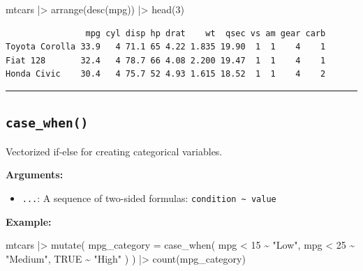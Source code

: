 \documentclass[
  letterpaper,
  DIV=11,
  numbers=noendperiod]{scrreprt}
\newenvironment{Shaded}{\begin{snugshade}}{\end{snugshade}}
\newcommand{\AttributeTok}[1]{\textcolor[rgb]{0.40,0.45,0.13}{#1}}
\newcommand{\ConstantTok}[1]{\textcolor[rgb]{0.56,0.35,0.01}{#1}}
\newcommand{\DecValTok}[1]{\textcolor[rgb]{0.68,0.00,0.00}{#1}}
\newcommand{\FunctionTok}[1]{\textcolor[rgb]{0.28,0.35,0.67}{#1}}
\newcommand{\NormalTok}[1]{\textcolor[rgb]{0.00,0.23,0.31}{#1}}
\newcommand{\SpecialCharTok}[1]{\textcolor[rgb]{0.37,0.37,0.37}{#1}}
\newcommand{\StringTok}[1]{\textcolor[rgb]{0.13,0.47,0.30}{#1}}
\providecommand{\tightlist}{%
  \setlength{\itemsep}{0pt}\setlength{\parskip}{0pt}}
\begin{document}
\begin{Shaded}
\begin{Highlighting}[]
\NormalTok{mtcars }\SpecialCharTok{|\textgreater{}}
  \FunctionTok{arrange}\NormalTok{(}\FunctionTok{desc}\NormalTok{(mpg)) }\SpecialCharTok{|\textgreater{}}
  \FunctionTok{head}\NormalTok{(}\DecValTok{3}\NormalTok{)}
\end{Highlighting}
\end{Shaded}

\begin{verbatim}
                mpg cyl disp hp drat    wt  qsec vs am gear carb
Toyota Corolla 33.9   4 71.1 65 4.22 1.835 19.90  1  1    4    1
Fiat 128       32.4   4 78.7 66 4.08 2.200 19.47  1  1    4    1
Honda Civic    30.4   4 75.7 52 4.93 1.615 18.52  1  1    4    2
\end{verbatim}

\begin{center}\rule{0.5\linewidth}{0.5pt}\end{center}

\subsection{\texorpdfstring{\texttt{case\_when()}}{case\_when()}}\label{case_when}

Vectorized if-else for creating categorical variables.

\textbf{Arguments:}

\begin{itemize}
\tightlist
\item
  \texttt{...}: A sequence of two-sided formulas:
  \texttt{condition\ \textasciitilde{}\ value}
\end{itemize}

\textbf{Example:}

\begin{Shaded}
\begin{Highlighting}[]
\NormalTok{mtcars }\SpecialCharTok{|\textgreater{}}
  \FunctionTok{mutate}\NormalTok{(}
    \AttributeTok{mpg\_category =} \FunctionTok{case\_when}\NormalTok{(}
\NormalTok{      mpg }\SpecialCharTok{\textless{}} \DecValTok{15} \SpecialCharTok{\textasciitilde{}} \StringTok{"Low"}\NormalTok{,}
\NormalTok{      mpg }\SpecialCharTok{\textless{}} \DecValTok{25} \SpecialCharTok{\textasciitilde{}} \StringTok{"Medium"}\NormalTok{,}
      \ConstantTok{TRUE} \SpecialCharTok{\textasciitilde{}} \StringTok{"High"}
\NormalTok{    )}
\NormalTok{  ) }\SpecialCharTok{|\textgreater{}}
  \FunctionTok{count}\NormalTok{(mpg\_category)}
\end{Highlighting}
\end{Shaded}
\end{document}
